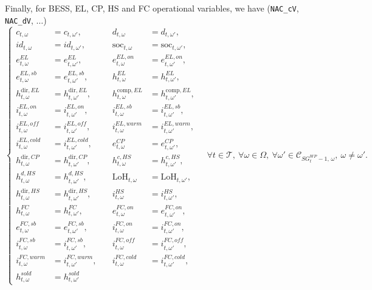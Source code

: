 \documentclass{article}
\begin{document}
Finally, for BESS, EL, CP, HS and FC operational variables, we have
(\verb|NAC_cV|, \verb|NAC_dV|, $\ldots$)
\begin{equation}
\left\{
\begin{aligned}
  c_{t,\omega}          &= c_{t,\omega'},         &\quad
  d_{t,\omega}          &= d_{t,\omega'},          \\[0.5ex]
  id_{t,\omega}         &= id_{t,\omega'},         &\quad
  \text{soc}_{t,\omega} &= \text{soc}_{t,\omega'}, \\[0.5ex]
  e^{EL}_{t,\omega}     &= e^{EL}_{t,\omega'},     &\quad
  e^{EL,on}_{t,\omega}  &= e^{EL,on}_{t,\omega'},  \\[0.5ex]
  e^{EL,sb}_{t,\omega}  &= e^{EL,sb}_{t,\omega'},  &\quad
  h^{EL}_{t,\omega}     &= h^{EL}_{t,\omega'},      \\[0.5ex]
  h^{\mathrm{dir},EL}_{t,\omega}  &= h^{\mathrm{dir},EL}_{t,\omega'},  &\quad
  h^{\mathrm{comp},EL}_{t,\omega} &= h^{\mathrm{comp},EL}_{t,\omega'}, \\[0.5ex]
  i^{EL,on}_{t,\omega}  &= i^{EL,on}_{t,\omega'},  &\quad
  i^{EL,sb}_{t,\omega}  &= i^{EL,sb}_{t,\omega'},  \\[0.5ex]
  i^{EL,off}_{t,\omega} &= i^{EL,off}_{t,\omega'}, &\quad
  i^{EL,warm}_{t,\omega}&= i^{EL,warm}_{t,\omega'}, \\[0.5ex]
  i^{EL,cold}_{t,\omega}&= i^{EL,cold}_{t,\omega'}, &\quad
  e^{CP}_{t,\omega}     &= e^{CP}_{t,\omega'},       \\[0.5ex]
  h^{\mathrm{dir},CP}_{t,\omega} &= h^{\mathrm{dir},CP}_{t,\omega'}, &\quad
  h^{c,HS}_{t,\omega}   &= h^{c,HS}_{t,\omega'},    \\[0.5ex]
  h^{d,HS}_{t,\omega}   &= h^{d,HS}_{t,\omega'},    &\quad
  \text{LoH}_{t,\omega} &= \text{LoH}_{t,\omega'},  \\[0.5ex]
  h^{\mathrm{dir},HS}_{t,\omega} &= h^{\mathrm{dir},HS}_{t,\omega'}, &\quad
  i^{HS}_{t,\omega}     &= i^{HS}_{t,\omega'},       \\[0.5ex]
  h^{FC}_{t,\omega}     &= h^{FC}_{t,\omega'},       &\quad
  e^{FC,on}_{t,\omega}  &= e^{FC,on}_{t,\omega'},    \\[0.5ex]
  e^{FC,sb}_{t,\omega}  &= e^{FC,sb}_{t,\omega'},    &\quad
  i^{FC,on}_{t,\omega}  &= i^{FC,on}_{t,\omega'},    \\[0.5ex]
  i^{FC,sb}_{t,\omega}  &= i^{FC,sb}_{t,\omega'},    &\quad
  i^{FC,off}_{t,\omega} &= i^{FC,off}_{t,\omega'},   \\[0.5ex]
  i^{FC,warm}_{t,\omega}&= i^{FC,warm}_{t,\omega'},  &\quad
  i^{FC,cold}_{t,\omega}&= i^{FC,cold}_{t,\omega'},  \\[0.5ex]
  h^{sold}_{t,\omega}   &= h^{sold}_{t,\omega'}
\end{aligned}
\right.
\quad \forall t \in \mathcal{T},\ \forall \omega \in \Omega,\
\forall \omega' \in \mathcal{C}_{SG^{WP}_t - 1,\, \omega},\ \omega \neq \omega'.
\label{EQ:NAC_ops}
\end{equation}
\end{document}
